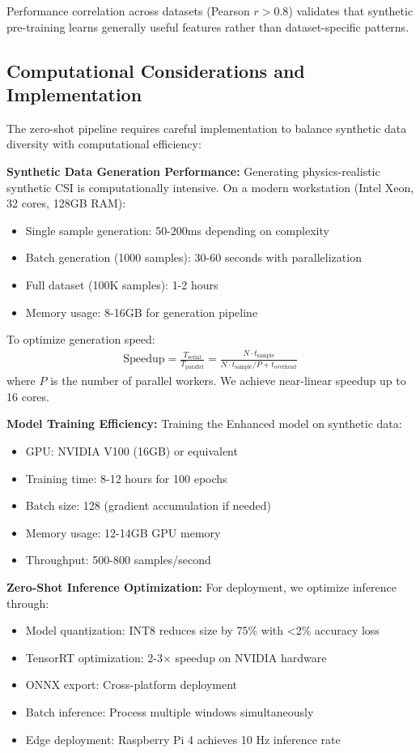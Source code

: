 \documentclass[journal]{IEEEtran}
\begin{document}
Performance correlation across datasets (Pearson $r > 0.8$) validates that synthetic pre-training learns generally useful features rather than dataset-specific patterns.

\subsection{Computational Considerations and Implementation}
The zero-shot pipeline requires careful implementation to balance synthetic data diversity with computational efficiency:

\textbf{Synthetic Data Generation Performance:}
Generating physics-realistic synthetic CSI is computationally intensive. On a modern workstation (Intel Xeon, 32 cores, 128GB RAM):
\begin{itemize}
\item Single sample generation: 50-200ms depending on complexity
\item Batch generation (1000 samples): 30-60 seconds with parallelization
\item Full dataset (100K samples): 1-2 hours
\item Memory usage: 8-16GB for generation pipeline
\end{itemize}

To optimize generation speed:
\begin{align}
\text{Speedup} = \frac{T_{\text{serial}}}{T_{\text{parallel}}} = \frac{N \cdot t_{\text{sample}}}{N \cdot t_{\text{sample}}/P + t_{\text{overhead}}}
\end{align}
where $P$ is the number of parallel workers. We achieve near-linear speedup up to 16 cores.

\textbf{Model Training Efficiency:}
Training the Enhanced model on synthetic data:
\begin{itemize}
\item GPU: NVIDIA V100 (16GB) or equivalent
\item Training time: 8-12 hours for 100 epochs
\item Batch size: 128 (gradient accumulation if needed)
\item Memory usage: 12-14GB GPU memory
\item Throughput: 500-800 samples/second
\end{itemize}

\textbf{Zero-Shot Inference Optimization:}
For deployment, we optimize inference through:
\begin{itemize}
\item Model quantization: INT8 reduces size by 75\% with <2\% accuracy loss
\item TensorRT optimization: 2-3× speedup on NVIDIA hardware
\item ONNX export: Cross-platform deployment
\item Batch inference: Process multiple windows simultaneously
\item Edge deployment: Raspberry Pi 4 achieves 10 Hz inference rate
\end{itemize}
\end{document}
